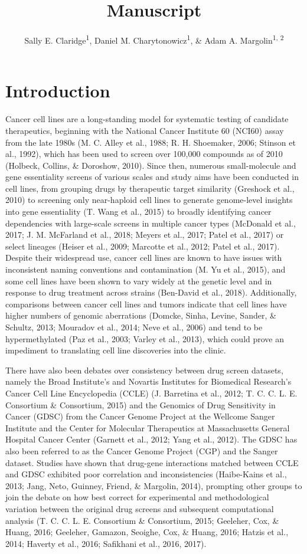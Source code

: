 \documentclass[man]{apa6}
\title{Manuscript}
\author{Sally E. Claridge\textsuperscript{1}, Daniel M.
Charytonowicz\textsuperscript{1}, \& Adam A.
Margolin\textsuperscript{1, 2}}
\date{}
\affiliation{
\vspace{0.5cm}
\textsuperscript{1} Department of Genetics and Genomic Sciences, Icahn Institute for Data Science and Genomic Technology, Icahn School of Medicine at Mount Sinai, New York, NY\\\textsuperscript{2} Cancer Target Discovery and Development Network (Oregon Health and Science University, Portland, OR), National Cancer Institute, National Institutes of Health}
\begin{document}
\maketitle

\section{Introduction}\label{introduction}

Cancer cell lines are a long-standing model for systematic testing of
candidate therapeutics, beginning with the National Cancer Institute 60
(NCI60) assay from the late 1980s (M. C. Alley et al., 1988; R. H.
Shoemaker, 2006; Stinson et al., 1992), which has been used to screen
over 100,000 compounds as of 2010 (Holbeck, Collins, \& Doroshow, 2010).
Since then, numerous small-molecule and gene essentiality screens of
various scales and study aims have been conducted in cell lines, from
grouping drugs by therapeutic target similarity (Greshock et al., 2010)
to screening only near-haploid cell lines to generate genome-level
insights into gene essentiality (T. Wang et al., 2015) to broadly
identifying cancer dependencies with large-scale screens in multiple
cancer types (McDonald et al., 2017; J. M. McFarland et al., 2018;
Meyers et al., 2017; Patel et al., 2017) or select lineages (Heiser et
al., 2009; Marcotte et al., 2012; Patel et al., 2017). Despite their
widespread use, cancer cell lines are known to have issues with
inconsistent naming conventions and contamination (M. Yu et al., 2015),
and some cell lines have been shown to vary widely at the genetic level
and in response to drug treatment across strains (Ben-David et al.,
2018). Additionally, comparisons between cancer cell lines and tumors
indicate that cell lines have higher numbers of genomic aberrations
(Domcke, Sinha, Levine, Sander, \& Schultz, 2013; Mouradov et al., 2014;
Neve et al., 2006) and tend to be hypermethylated (Paz et al., 2003;
Varley et al., 2013), which could prove an impediment to translating
cell line discoveries into the clinic.

There have also been debates over consistency between drug screen
datasets, namely the Broad Institute's and Novartis Institutes for
Biomedical Research's Cancer Cell Line Encyclopedia (CCLE) (J. Barretina
et al., 2012; T. C. C. L. E. Consortium \& Consortium, 2015) and the
Genomics of Drug Sensitivity in Cancer (GDSC) from the Cancer Genome
Project at the Wellcome Sanger Institute and the Center for Molecular
Therapeutics at Massachusetts General Hospital Cancer Center (Garnett et
al., 2012; Yang et al., 2012). The GDSC has also been referred to as the
Cancer Genome Project (CGP) and the Sanger dataset. Studies have shown
that drug-gene interactions matched between CCLE and GDSC exhibited poor
correlation and inconsistencies (Haibe-Kains et al., 2013; Jang, Neto,
Guinney, Friend, \& Margolin, 2014), prompting other groups to join the
debate on how best correct for experimental and methodological variation
between the original drug screens and subsequent computational analysis
(T. C. C. L. E. Consortium \& Consortium, 2015; Geeleher, Cox, \& Huang,
2016; Geeleher, Gamazon, Seoighe, Cox, \& Huang, 2016; Hatzis et al.,
2014; Haverty et al., 2016; Safikhani et al., 2016, 2017).
\end{document}
